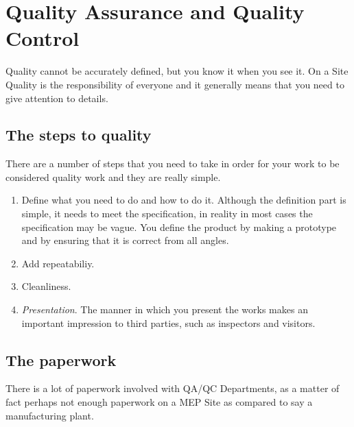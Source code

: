 \chapter{Quality Assurance and Quality Control}

Quality cannot be accurately defined, but you know it when you see it. On a Site
Quality is the responsibility of everyone and it generally means that you need to
give attention to details.

\section*{The steps to quality}

There are a number of steps that you need to take in order for your work to
be considered quality work and they are really simple.

\begin{enumerate}[1)]
\item  Define what you need to do and how to do it. Although the definition part
is simple, it needs to meet the specification, in reality in most cases the specification may be vague. You define the product by making a prototype and by ensuring that it is correct from all angles.

\item Add repeatabiliy.

\item Cleanliness.

\item \textit{Presentation}. The manner in which you present the works makes an important impression to third parties,
such as inspectors and visitors. 

\end{enumerate}

\section*{The paperwork}

There is a lot of paperwork involved with QA/QC Departments, as a matter of fact perhaps not enough paperwork on a MEP Site as compared to say a manufacturing plant.